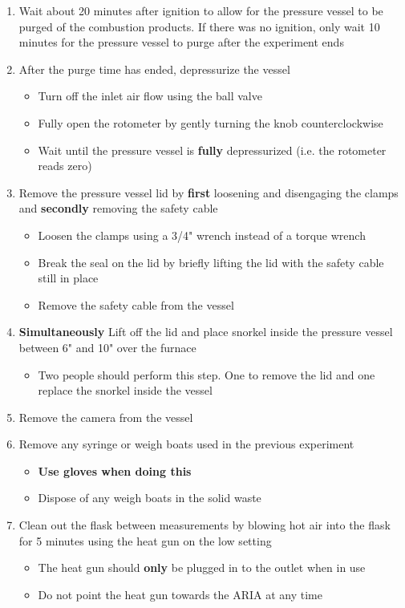 \documentclass[letterpaper,11pt]{article}
\begin{document}
\begin{enumerate}
    \item Wait about 20 minutes after ignition to allow for the pressure 
        vessel to be purged of the combustion products. If there was no ignition,
		only wait 10 minutes for the pressure vessel to purge after the experiment ends 
    \item After the purge time has ended, depressurize the vessel
        \begin{itemize}
        \item Turn off the inlet air flow using the ball valve
        \item Fully open the rotometer by gently turning the knob counterclockwise
		\item Wait until the pressure vessel is \textbf{fully} depressurized (i.e. the rotometer 
            reads zero)
        \end{itemize}
    \item Remove the pressure vessel lid by \textbf{first} loosening and 
        disengaging the clamps and \textbf{secondly} removing the safety cable
        \begin{itemize}
        \item Loosen the clamps using a 3/4" wrench instead of a 
            torque wrench
		\item Break the seal on the lid by briefly lifting the lid with the safety cable still in 
                place
        \item Remove the safety cable from the vessel
        \end{itemize}
    \item \textbf{Simultaneously} Lift off the lid and place snorkel inside the pressure vessel 
        between 6" and 10" over the furnace
        \begin{itemize}
        \item Two people should perform this step. One to remove the lid and one
            replace the snorkel inside the vessel
        \end{itemize}
	\item Remove the camera from the vessel
    \item Remove any syringe or weigh boats used in the previous experiment
        \begin{itemize}
        \item \textbf{Use gloves when doing this}
        \item Dispose of any weigh boats in the solid waste
        \end{itemize}
    \item Clean out the flask between measurements by blowing hot air into
            the flask for 5 minutes using the heat gun on the low setting
        \begin{itemize}
        \item The heat gun should \textbf{only} be plugged in to the outlet 
            when in use
        \item Do not point the heat gun towards the ARIA at any time
        \end{itemize}
    

\end{enumerate}
\end{document}
